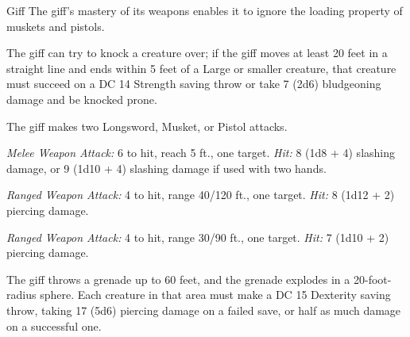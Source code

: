 \documentclass[10pt,a4paper,twoside,bg=print,twocolumn,openany,nodeprecatedcode]{dndbook}
\begin{document}
\begin{DndMonster}[float=t]{Giff}
\DndMonsterBasics[
armor-class = {16 (\textit{breastplate})},
hit-points = {\DndDice{8d8 + 24}},
speed = {30 ft.}
]
\DndMonsterAbilityScores[
 str = 18,
 dex = 14,
 con = 17,
 int = 11,
 wis = 12,
 cha = 12
]
\DndMonsterDetails[
languages = {Common},
challenge = 3,
]
The giff's mastery of its weapons enables it to ignore the loading property of muskets and pistols.

The giff can try to knock a creature over; if the giff moves at least 20 feet in a straight line and ends within 5 feet of a Large or smaller creature, that creature must succeed on a DC 14 Strength saving throw or take 7 (2d6) bludgeoning damage and be knocked prone.

The giff makes two Longsword, Musket, or Pistol attacks.

\textsl{Melee Weapon Attack:} 6 to hit, reach 5 ft., one target. \textsl{Hit:} 8 (1d8 + 4) slashing damage, or 9 (1d10 + 4) slashing damage if used with two hands.

\textsl{Ranged Weapon Attack:} 4 to hit, range 40/120 ft., one target. \textsl{Hit:} 8 (1d12 + 2) piercing damage.

\textsl{Ranged Weapon Attack:} 4 to hit, range 30/90 ft., one target. \textsl{Hit:} 7 (1d10 + 2) piercing damage.

The giff throws a grenade up to 60 feet, and the grenade explodes in a 20-foot-radius sphere. Each creature in that area must make a DC 15 Dexterity saving throw, taking 17 (5d6) piercing damage on a failed save, or half as much damage on a successful one.

\end{DndMonster}
\end{document}
